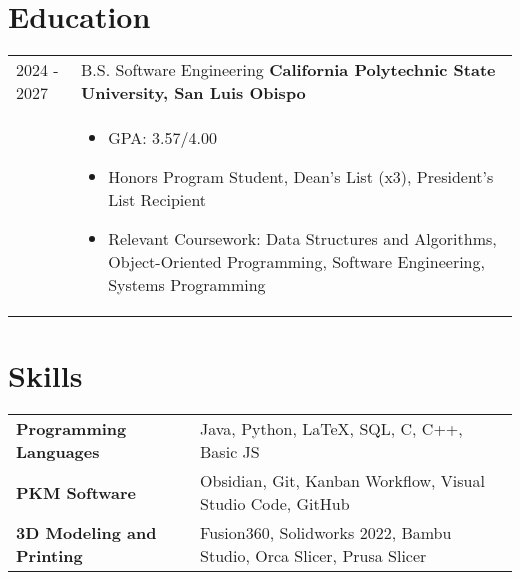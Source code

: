 \documentclass[a4paper,12pt]{article}
\begin{document}
\section{Education}
\begin{tabularx}{\linewidth}{@{}l X@{}}	
2024 - 2027 & B.S. Software Engineering \textbf{California Polytechnic State University, San Luis Obispo} \\
& \begin{itemize}[leftmargin=*, nosep]
    \item GPA: 3.57/4.00
    \item Honors Program Student, Dean's List (x3), President's List Recipient
    \item Relevant Coursework: Data Structures and Algorithms, Object-Oriented Programming, Software Engineering, Systems Programming
  \end{itemize}
\end{tabularx}

\section{Skills}
\begin{tabularx}{\linewidth}{@{}l X@{}}
\textbf{Programming Languages} &  \normalsize{Java, Python, LaTeX, SQL, C, C++, Basic JS}\\
\textbf{PKM Software}  &  \normalsize{Obsidian, Git, Kanban Workflow, Visual Studio Code, GitHub}\\  
\textbf{3D Modeling and Printing}  &  \normalsize{Fusion360, Solidworks 2022, Bambu Studio, Orca Slicer, Prusa Slicer}\\
\end{tabularx}

\vfill
{}
\end{document}
